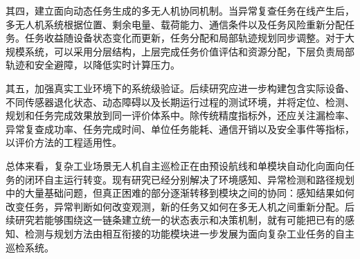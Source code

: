 其四，建立面向动态任务生成的多无人机协同机制。当异常复查任务在线产生后，多无人机系统根据位置、剩余电量、载荷能力、通信条件以及任务风险重新分配任务。任务收益随设备状态变化而更新，任务分配和局部轨迹规划同步调整。对于大规模系统，可以采用分层结构，上层完成任务价值评估和资源分配，下层负责局部轨迹和安全避障，以降低实时计算压力。

其五，加强真实工业环境下的系统级验证。后续研究应进一步构建包含实际设备、不同传感器退化状态、动态障碍以及长期运行过程的测试环境，并将定位、检测、规划和任务完成效果放到同一评价体系中。除传统精度指标外，还应关注漏检率、异常复查成功率、任务完成时间、单位任务能耗、通信开销以及安全事件等指标，以评价方法的工程适用性。

总体来看，复杂工业场景无人机自主巡检正在由预设航线和单模块自动化向面向任务的闭环自主运行转变。现有研究已经分别解决了环境感知、异常检测和路径规划中的大量基础问题，但真正困难的部分逐渐转移到模块之间的协同：感知结果如何改变任务，异常判断如何改变观测，新的任务又如何在多无人机之间重新分配。后续研究若能够围绕这一链条建立统一的状态表示和决策机制，就有可能把已有的感知、检测与规划方法由相互衔接的功能模块进一步发展为面向复杂工业任务的自主巡检系统。

